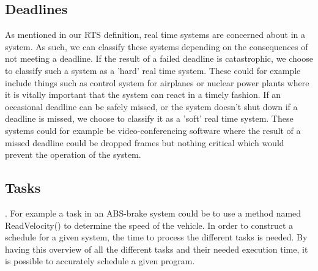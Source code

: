 \subsection{Deadlines}

As mentioned in our RTS definition, real time systems are concerned about
 in a system. As such, we can classify these
systems depending on the consequences of not meeting a deadline. If the result of a failed deadline is
catastrophic, we choose to classify such a system as a 'hard' real time
system. These could for example include things such as control system for
airplanes or nuclear power plants where it is vitally important that the
system can react in a timely fashion. If an occasional deadline can be safely
missed, or the system doesn't shut down if a deadline is missed, we choose to
classify it as a 'soft' real time system. These systems could for example be 
video-conferencing software where the result of a missed deadline could be
dropped frames but nothing critical which would prevent the operation of the
system.


\subsection{Tasks}
.
For example a task in an ABS-brake system could be to use a method named ReadVelocity() to determine the speed of
the vehicle. In order to construct a schedule for a given system, the time to
process the different tasks is needed. By having this overview of
all the different tasks and their needed execution time, it is possible to
accurately schedule a given program.


